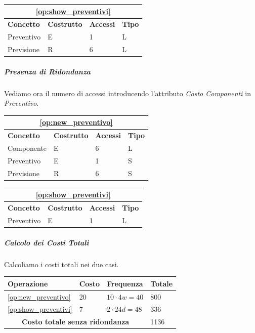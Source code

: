					\begin{tabular}{| p{3cm} | p{3cm} | p{3cm} | p{3cm} |}
						\hline
						\multicolumn{4}{|c|}{\textbf{\ref{op:show_preventivi}}} \\ \hline
						\textbf{Concetto} & \textbf{Costrutto} & \textbf{Accessi} & \textbf{Tipo} \\ \hline
						Preventivo 		& E & 1 & L \\
						Previsione		& R & 6 & L \\
						\hline
					\end{tabular}
					\vspace{2ex}

				\subparagraph{Presenza di Ridondanza}
					Vediamo ora il numero di accessi introducendo l'attributo \emph{Costo Componenti} in \emph{Preventivo}.

					\vspace{2ex}
					\begin{tabular}{| p{3cm} | p{3cm} | p{3cm} | p{3cm} |}
						\hline
						\multicolumn{4}{|c|}{\textbf{\ref{op:new_preventivo}}} \\ \hline
						\textbf{Concetto} & \textbf{Costrutto} & \textbf{Accessi} & \textbf{Tipo} \\ \hline
						Componente 		& E & 6 & L \\
						Preventivo 		& E & 1 & S \\
						Previsione		& R & 6 & S \\
						\hline
					\end{tabular}

					\begin{tabular}{| p{3cm} | p{3cm} | p{3cm} | p{3cm} |}
						\hline
						\multicolumn{4}{|c|}{\textbf{\ref{op:show_preventivi}}} \\ \hline
						\textbf{Concetto} & \textbf{Costrutto} & \textbf{Accessi} & \textbf{Tipo} \\ \hline
						Preventivo 		& E & 1 & L \\
						\hline
					\end{tabular}
					\vspace{2ex}

				\subparagraph{Calcolo dei Costi Totali}

					Calcoliamo i costi totali nei due casi.

					\vspace{2ex}
					\begin{tabular}{| p{3cm} | p{3cm} | p{3cm} | p{3cm} |}
						\hline
						\textbf{Operazione} & \textbf{Costo} & \textbf{Frequenza} & \textbf{Totale} \\ \hline
						\ref{op:new_preventivo}		& 20 	& $10 \cdot 4w = 40$	& 800	\\
						\ref{op:show_preventivi} 	& 7 	& $2 \cdot 24d = 48$	& 336	\\
						\hline
						\multicolumn{3}{|c|}{\textbf{Costo totale senza ridondanza}} & 1136 \\
						\hline
					\end{tabular}

